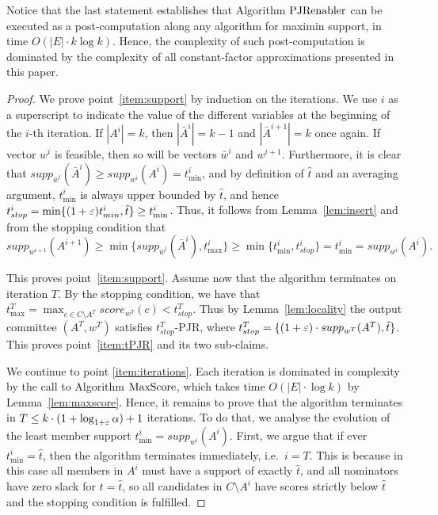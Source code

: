 Notice that the last statement establishes that Algorithm $\operatorname{PJRenabler}$ can be executed as a post-computation along any algorithm for maximin support, in time $O(|E|\cdot k\log k)$. Hence, the complexity of such post-computation is dominated by the complexity of all constant-factor approximations presented in this paper.

\begin{proof}
We prove point~\ref{item:support} by induction on the iterations. 
We use $i$ as a superscript to indicate the value of the different variables at the beginning of the $i$-th iteration. 
If $|A^i|=k$, then $|\bar{A}^i|=k-1$ and $|\bar{A}^{i+1}|=k$ once again. 
If vector $w^i$ is feasible, then so will be vectors $\bar{w}^i$ and $w^{i+1}$. Furthermore, it is clear that $supp_{\bar{w}^i}(\bar{A}^i)\geq supp_{w^i}(A^i)=t^i_{\min}$, and by definition of $\hat{t}$ and an averaging argument, $t^i_{\min}$ is always upper bounded by $\hat{t}$, and hence $t^i_{stop} = \min\{ (1+\varepsilon)t^i_{min}, \hat{t} \} \geq t^i_{\min}$. Thus, it follows from Lemma~\ref{lem:insert} and from the stopping condition that 
$$supp_{w^{i+1}}(A^{i+1}) \geq \min\{ supp_{\bar{w}^{i}}(\bar{A}^{i}), t^i_{\max} \}\geq \min\{ t^i_{\min}, t^i_{stop}\} = t^i_{\min}=supp_{w^i}(A^i). $$

This proves point~\ref{item:support}. 
Assume now that the algorithm terminates on iteration $T$. By the stopping condition, we have that $t^T_{\max}=\max_{c\in C\setminus A^T} score_{w^T}(c) < t^T_{stop}$. 
Thus by Lemma~\ref{lem:locality} the output committee $(A^T, w^T)$ satisfies $t^T_{stop}$-PJR, where $t^T_{stop}=\{(1+\varepsilon)\cdot supp_{w^T}(A^T), \hat{t}\}$. This proves point~\ref{item:tPJR} and its two sub-claims.

We continue to point \ref{item:iterations}. Each iteration is dominated in complexity by the call to Algorithm $\operatorname{MaxScore}$, which takes time $O(|E|\cdot \log k)$ by Lemma~\ref{lem:maxscore}. Hence, it remains to prove that the algorithm terminates in $T\leq k\cdot (1+\log_{1+\varepsilon} \alpha)+1$ iterations. To do that, we analyse the evolution of the least member support $t^i_{\min}=supp_{w^i}(A^i)$. First, we argue that if ever $t^i_{\min}=\hat{t}$, then the algorithm terminates immediately, i.e.~$i=T$. This is because in this case all members in $A^i$ must have a support of exactly $\hat{t}$, and all nominators have zero slack for $t= \hat{t}$, so all candidates in $C\setminus A^i$ have scores strictly below $\hat{t}$ and the stopping condition is fulfilled.


\end{proof}
